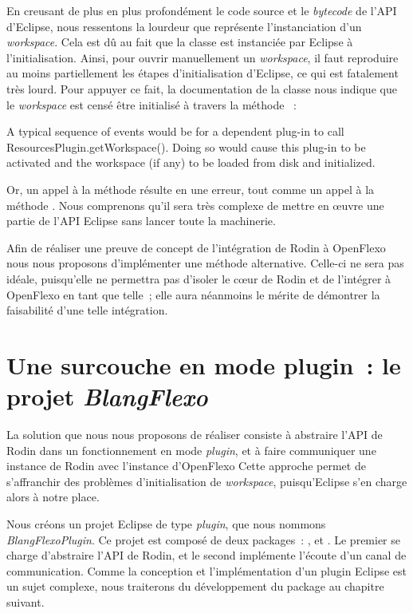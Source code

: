 En creusant de plus en plus profondément le code source et le \textit{bytecode} de l'API d'Eclipse, nous ressentons la lourdeur que représente l'instanciation d'un \textit{workspace}.
Cela est dû au fait que la classe  est instanciée par Eclipse à l'initialisation.
Ainsi, pour ouvrir manuellement un \textit{workspace}, il faut reproduire au moins partiellement les étapes d'initialisation d'Eclipse, ce qui est fatalement très lourd.
Pour appuyer ce fait, la documentation de la classe  \cite{eclipseresourcesplugin} nous indique que le \textit{workspace} est censé être initialisé à travers la méthode %
~:\\

\begin{imtaQuote}
A typical sequence of events would be for a dependent plug-in to call\\ResourcesPlugin.getWorkspace().
Doing so would cause this plug-in to be activated and the workspace (if any) to be loaded from disk and initialized.
\end{imtaQuote}

Or, un appel à la méthode  résulte en une erreur, tout comme un appel à la méthode .
Nous comprenons qu'il sera très complexe de mettre en œuvre une partie de l'API Eclipse sans lancer toute la machinerie.

Afin de réaliser une preuve de concept de l'intégration de Rodin à OpenFlexo nous nous proposons d'implémenter une méthode alternative.
Celle-ci ne sera pas idéale, puisqu'elle ne permettra pas d'isoler le cœur de Rodin et de l'intégrer à OpenFlexo en tant que telle~; %
elle aura néanmoins le mérite de démontrer la faisabilité d'une telle intégration.


\section{Une surcouche en mode plugin~: le projet \textit{BlangFlexo}}

La solution que nous nous proposons de réaliser consiste à abstraire l'API de Rodin dans un fonctionnement en mode \textit{plugin}, et à faire communiquer une instance de Rodin %
avec l'instance d'OpenFlexo
Cette approche permet de s'affranchir des problèmes d'initialisation de \textit{workspace}, puisqu'Eclipse s'en charge alors à notre place.

Nous créons un projet Eclipse de type \textit{plugin}, que nous nommons \textit{BlangFlexoPlugin}.
Ce projet est composé de deux packages~: , et .
Le premier se charge d'abstraire l'API de Rodin, et le second implémente l'écoute d'un canal de communication.
Comme la conception et l'implémentation d'un plugin Eclipse est un sujet complexe, nous traiterons du développement du package  au chapitre suivant.

